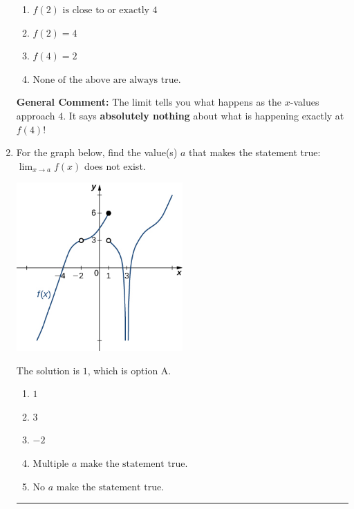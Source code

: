\documentclass{extbook}[14pt]
\newcommand{\litem}[1]{\item #1

\rule{\textwidth}{0.4pt}}
\begin{document}
\begin{enumerate}
{\begin{enumerate}[label=\Alph*.]
\item \( f(2) \text{ is close to or exactly } 4 \)


\item \( f(2) = 4 \)


\item \( f(4) = 2 \)


\item \( \text{None of the above are always true.} \)


\end{enumerate}

\textbf{General Comment:} The limit tells you what happens as the $x$-values approach $4$. It says \textbf{absolutely nothing} about what is happening exactly at $f(4)$!
}
\litem{
For the graph below, find the value(s) $a$ that makes the statement true: $ \displaystyle \lim_{x \rightarrow a} f(x)$ does not exist.

\begin{center}
    \includegraphics[width=0.5\textwidth]{../Figures/evaluateLimitGraphicallyB.png}
\end{center}


The solution is \( 1 \), which is option A.\begin{enumerate}[label=\Alph*.]
\item \( 1 \)


\item \( 3 \)


\item \( -2 \)


\item \( \text{Multiple } a \text{ make the statement true}. \)


\item \( \text{No } a \text{ make the statement true}. \)


\end{enumerate}

}
\end{enumerate}
\end{document}
